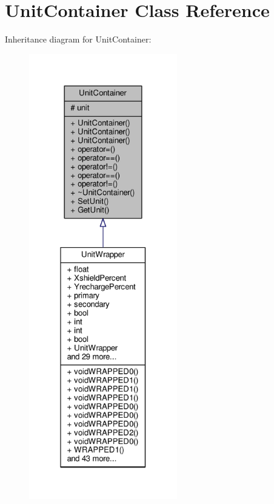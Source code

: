 \hypertarget{classUnitContainer}{}\section{Unit\+Container Class Reference}
\label{classUnitContainer}


Inheritance diagram for Unit\+Container\+:
\nopagebreak
\begin{figure}[H]
\begin{center}
\leavevmode
\includegraphics[height=550pt]{d6/dea/classUnitContainer__inherit__graph}
\end{center}
\end{figure}


